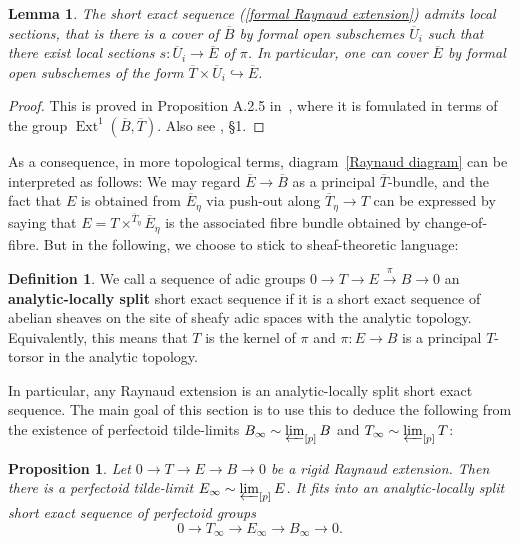 \documentclass[10pt,oneside]{amsart}
\newtheorem{lemma}[theorem]{Lemma}
\newtheorem{proposition}[theorem]{Proposition}
\theoremstyle{definition}
\newtheorem{definition}[theorem]{Definition}
\begin{document}
	\begin{lemma}\label{formal Raynaud sequence is locally split}
		The short exact sequence (\ref{formal Raynaud extension}) admits local sections, that is there is a cover of $\overline{B}$ by formal open subschemes $\overline{U}_i$ such that there exist local sections $s:\overline{U}_i\rightarrow \overline{E}$ of $\pi$. In particular, one can cover $\overline{E}$ by formal open subschemes of the form $\overline{T}\times \overline{U}_i\hookrightarrow \overline{E}$.
	\end{lemma}
	\begin{proof}
		This is proved in Proposition A.2.5 in~\cite{Lut}, where it is fomulated in terms of the group $\operatorname{Ext}^1(\overline{B},\overline{T})$. Also see \cite{BL}, \S 1.
	\end{proof}
	
	As a consequence, in more topological terms, diagram~\eqref{Raynaud diagram} can be interpreted as follows: We may regard
	$\overline{E}\rightarrow \overline{B}$ as a principal $\overline{T}$-bundle, and the fact that $E$ is obtained from $\overline{E}_\eta$ via push-out along $\overline{T}_\eta\rightarrow T$ can be expressed by saying that $E = T\times^{\overline{T}_\eta}\overline{E}_\eta$ is the associated fibre bundle obtained by change-of-fibre. But in the following, we choose to stick to sheaf-theoretic language:
	
	\begin{definition}
		We call a sequence of adic groups $0\to T\to E\xrightarrow{\pi} B\to 0$ an \textbf{analytic-locally split} short exact sequence if it is a short exact sequence of abelian sheaves on the site of sheafy adic spaces with the analytic topology. Equivalently, this means that $T$ is the kernel of $\pi$ and $\pi:E\to B$ is a principal $T$-torsor in the analytic topology.
	\end{definition}
	In particular, any Raynaud extension is an analytic-locally split short exact sequence. The main goal of this section is to use this to deduce the following from the existence of perfectoid tilde-limits $B_\infty\sim \varprojlim_{[p]}B$ and $T_\infty\sim \varprojlim_{[p]}T$:
	\begin{proposition}\label{p-F-formal tower exists for E}
		Let $0\to T\to E\to B\to 0$ be a rigid Raynaud extension. Then there is a perfectoid tilde-limit $E_\infty\sim \varprojlim_{[p]}E$. It fits into an analytic-locally split short exact sequence of perfectoid groups 
		\[0\to T_\infty\to E_\infty\to B_\infty\to 0.\]
	\end{proposition}
	
\end{document}
